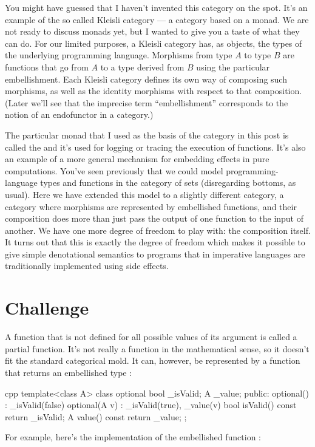 You might have guessed that I haven't invented this category on the
spot. It's an example of the so called Kleisli category --- a category
based on a monad. We are not ready to discuss monads yet, but I wanted
to give you a taste of what they can do. For our limited purposes, a
Kleisli category has, as objects, the types of the underlying
programming language. Morphisms from type $A$ to type $B$ are functions that
go from $A$ to a type derived from $B$ using the particular embellishment.
Each Kleisli category defines its own way of composing such morphisms,
as well as the identity morphisms with respect to that composition.
(Later we'll see that the imprecise term ``embellishment'' corresponds
to the notion of an endofunctor in a category.)

The particular monad that I used as the basis of the category in this
post is called the  and it's used for logging or
tracing the execution of functions. It's also an example of a more
general mechanism for embedding effects in pure computations. You've
seen previously that we could model programming-language types and
functions in the category of sets (disregarding bottoms, as usual). Here
we have extended this model to a slightly different category, a category
where morphisms are represented by embellished functions, and their
composition does more than just pass the output of one function to the
input of another. We have one more degree of freedom to play with: the
composition itself. It turns out that this is exactly the degree of
freedom which makes it possible to give simple denotational semantics to
programs that in imperative languages are traditionally implemented
using side effects.

\section{Challenge}

A function that is not defined for all possible values of its argument
is called a partial function. It's not really a function in the
mathematical sense, so it doesn't fit the standard categorical mold. It
can, however, be represented by a function that returns an embellished
type :

\begin{snip}{cpp}
template<class A> class optional {
    bool _isValid;
    A _value;
public: 
    optional()    : _isValid(false) {}
    optional(A v) : _isValid(true), _value(v) {}
    bool isValid() const { return _isValid; }
    A value() const { return _value; }
};
\end{snip}
For example, here's the implementation of the embellished function
:

